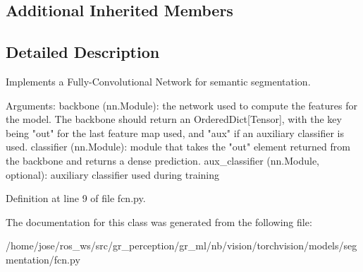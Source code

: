 \subsection*{Additional Inherited Members}


\subsection{Detailed Description}
\begin{DoxyVerb}Implements a Fully-Convolutional Network for semantic segmentation.

Arguments:
    backbone (nn.Module): the network used to compute the features for the model.
        The backbone should return an OrderedDict[Tensor], with the key being
        "out" for the last feature map used, and "aux" if an auxiliary classifier
        is used.
    classifier (nn.Module): module that takes the "out" element returned from
        the backbone and returns a dense prediction.
    aux_classifier (nn.Module, optional): auxiliary classifier used during training
\end{DoxyVerb}
 

Definition at line 9 of file fcn.\+py.



The documentation for this class was generated from the following file\+:\begin{DoxyCompactItemize}
\item 
/home/jose/ros\+\_\+ws/src/gr\+\_\+perception/gr\+\_\+ml/nb/vision/torchvision/models/segmentation/fcn.\+py\end{DoxyCompactItemize}
